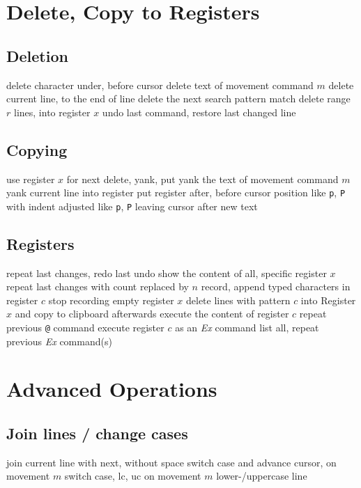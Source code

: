 \section{Delete, Copy to Registers}	{}
\subsection{Deletion}	{}
	{delete character under, before cursor}
	{delete text of movement command $m$}
	{delete current line, to the end of line}
	{delete the next search pattern match}
	{delete range $r$ lines, into register $x$}
	{undo last command, restore last changed line}

\subsection{Copying}	{}
	{use register $x$ for next delete, yank, put}
	{yank the text of movement command $m$}
	{yank current line into register}
	{put register after, before cursor position}
	{like {\tt p}, {\tt P} with indent adjusted}
	{like {\tt p}, {\tt P} leaving cursor after new text}

\subsection{Registers}{}
	{repeat last changes, redo last undo}
	{show the content of all, specific register $x$}
	{repeat last changes with count replaced by $n$ }
	{record, append typed characters in register $c$}
	{stop recording}
	{empty register $x$}
	{delete lines with pattern $c$ into Register $x$ and copy to clipboard afterwards}
	{execute the content of register $c$}
	{repeat previous {\tt @} command}
	{execute register $c$ as an {\it Ex\/} command}
	{list all, repeat previous {\it Ex\/} command(s)}

\section{Advanced Operations}{}

\subsection{Join lines / change cases}{}
	{join current line with next, without space}
	{switch case and advance cursor, on movement $m$ }
	{switch case, lc, uc on movement $m$}
	{lower-/uppercase line}

